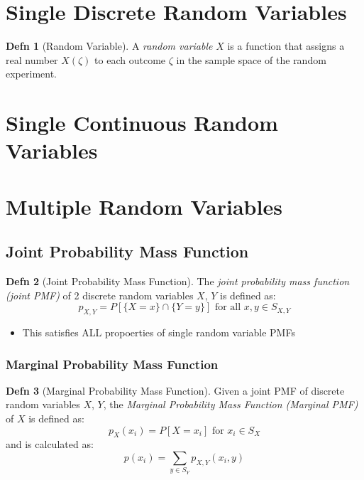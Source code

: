\documentclass[10pt,letterpaper,final,twoside,notitlepage]{article}
\theoremstyle{plain}
\theoremstyle{definition}
\newtheorem{definition}{Defn}
\begin{document}
\section{Single Discrete Random Variables} \label{sec:Single Discrete Random Variables}
	\begin{definition}[Random Variable]
		A \emph{random variable} $X$ is a function that assigns a real number $X \left( \zeta \right)$ to each outcome $\zeta$ in the sample space of the random experiment.
	\end{definition}
\section{Single Continuous Random Variables} \label{sec:Single Continuous Random Variables}

\section{Multiple Random Variables} \label{sec:Multiple Random Variables}
	\subsection[Joint PMF]{Joint Probability Mass Function} \label{subsec:Joint PMF}
		\begin{definition}[Joint Probability Mass Function] \label{def:Joint PMF}
			The \emph{joint probability mass function (joint PMF)} of 2 discrete random variables $X$, $Y$ is defined as:
			\begin{equation} \label{eq:Joint PMF}
				p_{X,Y} = P \left[ \lbrace X=x \rbrace \cap \lbrace Y=y \rbrace \right] \text{ for all } x,y \in S_{X,Y}
			\end{equation}
			\begin{itemize}[noitemsep, nolistsep]
				\item This satisfies ALL propoerties of single random variable PMFs
			\end{itemize}
		\end{definition}
	
		\subsubsection[Marginal PMF]{Marginal Probability Mass Function} \label{subsubsec:Marginal PMF}
			\begin{definition}[Marginal Probability Mass Function] \label{def:Marginal PMF}
				Given a joint PMF of discrete random variables $X$, $Y$, the \emph{Marginal Probability Mass Function (Marginal PMF)} of $X$ is defined as:
				\begin{equation} \label{eq:Marginal PMF}
					p_{X} \left( x_{i} \right) = P \left[ X = x_{i} \right] \text{ for } x_{i} \in S_{X}
				\end{equation}
				and is calculated as:
				\begin{equation} \label{eq:Calculate Marginal PMF}
					p \left( x_{i} \right) = \sum_{y \in S_{Y}} p_{X,Y} \left( x_{i}, y \right)
				\end{equation}
			\end{definition}
		
\end{document}
